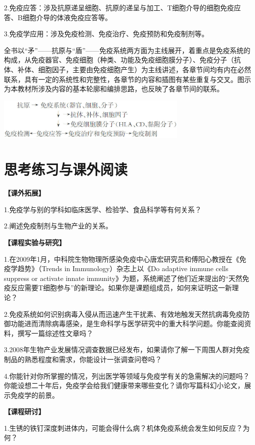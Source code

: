 2.免疫应答：涉及抗原递呈细胞、抗原的递呈与加工、T细胞介导的细胞免疫应答、B细胞介导的体液免疫应答等。

3.免疫学应用：涉及免疫检测、免疫治疗、免疫预防和免疫制剂等。

全书以“矛”------抗原与“盾”------免疫系统两方面为主线展开，着重点是免疫系统的构成，从免疫器官、免疫细胞（种类、功能及免疫细胞膜分子）、免疫分子（抗体、补体、细胞因子，主要由免疫细胞产生）为主线讲述，各章节间均有内在必然联系，具有一定的系统性和完整性，各章节的内容和插图有某些重复与交叉。图示为本教材所涉及内容的基本轮廓和编排思路，也反映了各章节间的联系。
\begin{center}
\includegraphics[width=0.7\textwidth]{./images/Image00024.jpg}
\end{center}

\section{思考练习与课外阅读}
\noindent\textbf{【课外拓展】}

1.免疫学与别的学科如临床医学、检验学、食品科学等有何关系？

2.阐述免疫制剂与生物产业的关系。

\noindent\textbf{【课程实验与研究】}

1.在2009年1月，中科院生物物理所感染免疫中心唐宏研究员和傅阳心教授在《免疫学趋势》（Trends
in Immunology）杂志上以《Do adaptive immune cells suppress or activate
innate
immunity》为题，系统阐述了他们近来提出的“天然免疫反应需要T细胞参与”的新理论。如果你是课题组成员，如何来证明这一新理论？

2.免疫系统如何识别病毒入侵从而迅速产生干扰素、有效地触发天然抗病毒免疫防御功能进而清除病毒感染，是生命科学与医学研究中的重大科学问题。你能查阅资料，撰写一篇综述性文章吗？

3.2008年生物产业发展情况调查数据已经发布，如果请你了解一下周围人群对免疫制品的熟悉程度和需求，你能设计一张调查问卷吗？

4.你能针对你所掌握的情况，列出医学等领域与免疫学有关的急需解决的问题吗？你能设想二十年后，免疫学会给我们健康带来哪些变化？请你写篇科幻小论文，展示免疫学的前景。

\noindent\textbf{【课程研讨】}

1.生锈的铁钉深度刺进体内，可能会得什么病？机体免疫系统会发生如何反应？为何？

